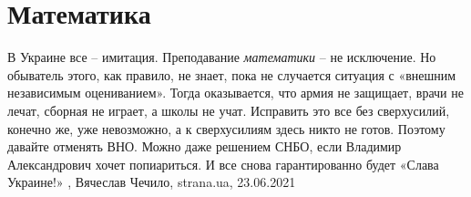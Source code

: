  
 
 
 
 
\chapter{Математика}
\label{sec:slova.matematika}

В Украине все – имитация. Преподавание \emph{математики} – не исключение. Но обыватель
этого, как правило, не знает, пока не случается ситуация с «внешним независимым
оцениванием». Тогда оказывается, что армия не защищает, врачи не лечат, сборная
не играет, а школы не учат. Исправить это все без сверхусилий, конечно же, уже
невозможно, а к сверхусилиям здесь никто не готов. Поэтому давайте отменять
ВНО. Можно даже решением СНБО, если Владимир Александрович хочет попиариться. И
все снова гарантированно будет «Слава Украине!»
, Вячеслав Чечило, strana.ua, 23.06.2021
